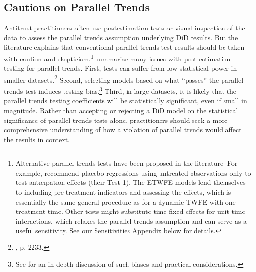 \documentclass[12pt]{article}
\begin{document}
\subsection{Cautions on Parallel Trends} \label{sec:parallel-trends}
Antitrust practitioners often use postestimation tests or visual inspection of the data to assess the parallel trends assumption underlying DiD results. But the literature explains that conventional parallel trends test results should be taken with caution and skepticism.\footnote{Alternative parallel trends tests have been proposed in the literature. For example, \citet{borusyak2024revisiting} recommend placebo regressions using untreated observations only to test anticipation effects (their Test 1). The ETWFE models lend themselves to including pre-treatment indicators and assessing the effects, which is essentially the same general procedure as for a dynamic TWFE with one treatment time. Other tests might substitute time fixed effects for unit-time interactions, which relaxes the parallel trends assumption and can serve as a useful sensitivity. See \hyperref[sec:appendixa]{our Sensitivities Appendix below} for details.} \citet{roth2023s} summarize many issues with post-estimation testing for parallel trends. First, tests can suffer from low statistical power in smaller datasets.\footnote{\citet{roth2023s}, p. 2233.}  Second, selecting models based on what “passes” the parallel trends test induces testing bias.\footnote{See \citet{roth2022a} for an in-depth discussion of such biases and practical considerations.}  Third, in large datasets, it is likely that the parallel trends testing coefficients will be statistically significant, even if small in magnitude. Rather than accepting or rejecting a DiD model on the statistical significance of parallel trends tests alone, practitioners should seek a more comprehensive understanding of how a violation of parallel trends would affect the results in context. 
\end{document}
